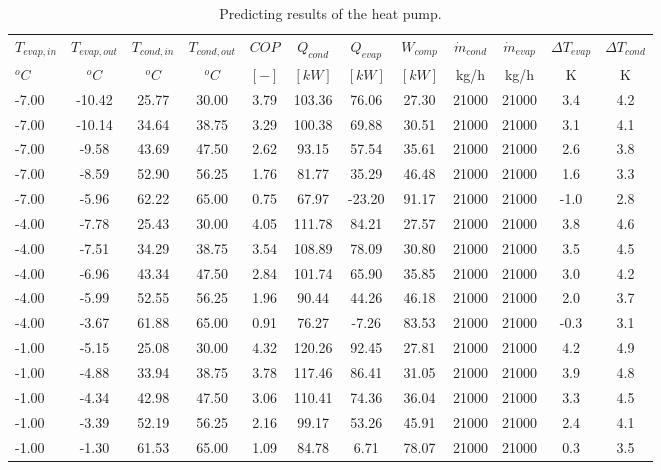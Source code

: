 \documentclass[english]{SPFShortReport}
\begin{document}
\begin{table}[!ht]
\begin{small}
\caption{Predicting results of the heat pump.}
\begin{center}
\resizebox{12cm}{!} 
{
\begin{tabular}{l | c c c c c c c c c c c } 
\hline
\hline
$T_{evap,in}$ &$T_{evap,out}$ &$T_{cond,in}$ &$T_{cond,out}$ &$COP$ &$Q_{cond}$ &$Q_{evap}$ &$W_{comp}$ &$\dot m_{cond}$ &$\dot m_{evap}$ &$\Delta T_{evap}$ &$\Delta T_{cond}$ \\ 
$^oC$ &$^oC$ &$^oC$ &$^oC$ &$[-]$ &$[kW]$ &$[kW]$ &$[kW]$ &kg/h &kg/h &K &K\\ 
\hline
-7.00 & -10.42 & 25.77 & 30.00 & 3.79 & 103.36 & 76.06 & 27.30 & 21000 & 21000 & 3.4 & 4.2\\ 
-7.00 & -10.14 & 34.64 & 38.75 & 3.29 & 100.38 & 69.88 & 30.51 & 21000 & 21000 & 3.1 & 4.1\\ 
-7.00 & -9.58 & 43.69 & 47.50 & 2.62 & 93.15 & 57.54 & 35.61 & 21000 & 21000 & 2.6 & 3.8\\ 
-7.00 & -8.59 & 52.90 & 56.25 & 1.76 & 81.77 & 35.29 & 46.48 & 21000 & 21000 & 1.6 & 3.3\\ 
-7.00 & -5.96 & 62.22 & 65.00 & 0.75 & 67.97 & -23.20 & 91.17 & 21000 & 21000 & -1.0 & 2.8\\ 
-4.00 & -7.78 & 25.43 & 30.00 & 4.05 & 111.78 & 84.21 & 27.57 & 21000 & 21000 & 3.8 & 4.6\\ 
-4.00 & -7.51 & 34.29 & 38.75 & 3.54 & 108.89 & 78.09 & 30.80 & 21000 & 21000 & 3.5 & 4.5\\ 
-4.00 & -6.96 & 43.34 & 47.50 & 2.84 & 101.74 & 65.90 & 35.85 & 21000 & 21000 & 3.0 & 4.2\\ 
-4.00 & -5.99 & 52.55 & 56.25 & 1.96 & 90.44 & 44.26 & 46.18 & 21000 & 21000 & 2.0 & 3.7\\ 
-4.00 & -3.67 & 61.88 & 65.00 & 0.91 & 76.27 & -7.26 & 83.53 & 21000 & 21000 & -0.3 & 3.1\\ 
-1.00 & -5.15 & 25.08 & 30.00 & 4.32 & 120.26 & 92.45 & 27.81 & 21000 & 21000 & 4.2 & 4.9\\ 
-1.00 & -4.88 & 33.94 & 38.75 & 3.78 & 117.46 & 86.41 & 31.05 & 21000 & 21000 & 3.9 & 4.8\\ 
-1.00 & -4.34 & 42.98 & 47.50 & 3.06 & 110.41 & 74.36 & 36.04 & 21000 & 21000 & 3.3 & 4.5\\ 
-1.00 & -3.39 & 52.19 & 56.25 & 2.16 & 99.17 & 53.26 & 45.91 & 21000 & 21000 & 2.4 & 4.1\\ 
-1.00 & -1.30 & 61.53 & 65.00 & 1.09 & 84.78 & 6.71 & 78.07 & 21000 & 21000 & 0.3 & 3.5\\ 

\end{tabular}}
\end{center}
\end{small}
\end{table}
\end{document}
